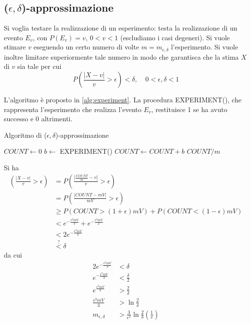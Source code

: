\subsection{($\epsilon, \delta$)-approssimazione}
Si voglia testare la realizzazione di un esperimento: testa la realizzazione di un evento $E_v$, con $P(E_v)=v$, $0<v<1$ (escludiamo i casi degeneri). Si vuole stimare $v$ eseguendo un certo numero di volte $m=m_{\epsilon,\delta}$ l'esperimento. Si vuole inoltre limitare superiormente tale numero in modo che garantisca che la stima $X$ di $v$ sia tale per cui
\[
P\left(\frac{|X-v|}{v}>\epsilon\right) < \delta, \ \ \ \ \ 0<\epsilon,\delta<1
\]

L'algoritmo è proposto in \ref{alg:experiment}. La procedura EXPERIMENT(), che rappresenta l'esperimento che realizza l'evento $E_v$, restituisce 1 se ha avuto successo e 0 altrimenti.

\begin{algorithm}
\caption{Algoritmo di ($\epsilon, \delta$)-approssimazione}
\label{alg:experiment}
\begin{algorithmic}
	\State $COUNT\gets 0$
		\State $b\gets$ EXPERIMENT()
		\State $COUNT\gets COUNT+b$
	\EndFor
	\State \Return $COUNT/m$
\EndFunction
\end{algorithmic}
\end{algorithm}

Si ha
\begin{align*}
\left(\frac{|X-v|}{v}>\epsilon\right)&=P\left(\frac{|\frac{COUNT}{m}-v|}{v} > \epsilon\right) \\
&=P\left(\frac{|COUNT -mV|}{mV}>\epsilon\right) \\
&\geq P(COUNT>(1+\epsilon)mV) + P(COUNT<(1-\epsilon)mV) \\
&<e^{-\frac{\epsilon^2mV}{3}}+e^{-\frac{\epsilon^2mV}{2}} \\
&<2e^{-\frac{\epsilon^2mV}{3}} \\
&\overset{?}{<}\delta
\end{align*}
da cui
\begin{align*}
2e^{-\frac{\epsilon^2mV}{3}}&<\delta \\
e^{-\frac{\epsilon^2mV}{3}}&<\frac{\delta}{2} \\
e^{\frac{\epsilon^2mV}{3}}&>\frac{2}{\delta} \\
\frac{\epsilon^2mV}{3}&>\ln\frac{2}{\delta} \\
m_{\epsilon,\delta}&>\frac{3}{\epsilon^2}\ln{\frac{2}{\delta}}\left(\frac{1}{v}\right)
\end{align*}

